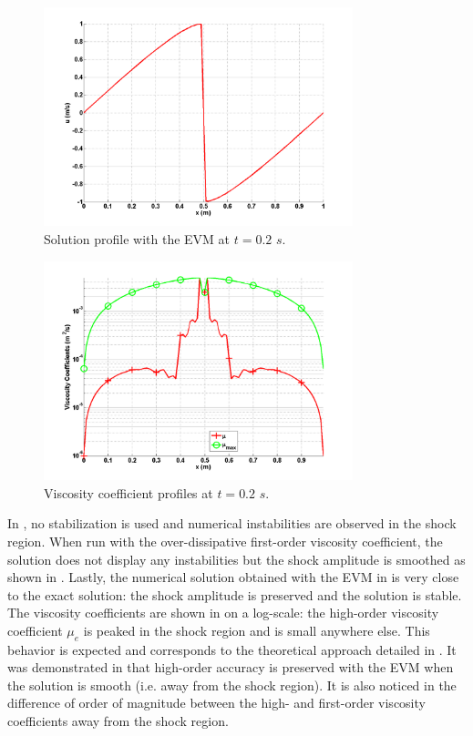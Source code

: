 \begin{figure}[H]
        \centering
        \includegraphics[width=0.8\textwidth]{figures/1D_sol_ev.png}
        \caption{Solution profile with the EVM at $t=0.2$ $s$.}
        \label{fig:1d_burger_ev}
\end{figure}
%       
\begin{figure}[H]
    \centering
    \includegraphics[width=0.8\textwidth]{figures/1D_visc.png}
    \caption{Viscosity coefficient profiles at $t=0.2$ $s$.}
    \label{fig:1d_burger_visc}
\end{figure}
%
In , no stabilization  is used and numerical instabilities are observed in the shock region. When run with the over-dissipative first-order viscosity coefficient, the solution does not display any instabilities but the shock amplitude is smoothed as shown in . Lastly, the numerical solution obtained with the EVM in  is very close to the exact solution: the shock amplitude is preserved and the solution is stable. The viscosity coefficients are shown in  on a log-scale: the high-order viscosity coefficient $\mu_e$ is peaked in the shock region and is small anywhere else. This behavior is expected and corresponds to the theoretical approach detailed in . It was demonstrated in \cite{valentin} that high-order accuracy is preserved with the EVM when the solution is smooth (i.e. away from the shock region). It is also noticed in  the difference of order of magnitude between the high- and first-order viscosity coefficients away from the shock region.
